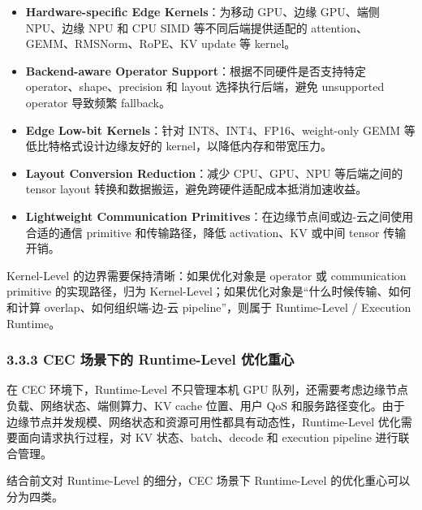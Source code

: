 \documentclass[a4paper,10pt]{ctexart}
\begin{document}
\begin{itemize}
\item \textbf{Hardware-specific Edge Kernels}：为移动 GPU、边缘 GPU、端侧 NPU、边缘 NPU 和 CPU SIMD 等不同后端提供适配的 attention、GEMM、RMSNorm、RoPE、KV update 等 kernel。

\item \textbf{Backend-aware Operator Support}：根据不同硬件是否支持特定 operator、shape、precision 和 layout 选择执行后端，避免 unsupported operator 导致频繁 fallback。

\item \textbf{Edge Low-bit Kernels}：针对 INT8、INT4、FP16、weight-only GEMM 等低比特格式设计边缘友好的 kernel，以降低内存和带宽压力。

\item \textbf{Layout Conversion Reduction}：减少 CPU、GPU、NPU 等后端之间的 tensor layout 转换和数据搬运，避免跨硬件适配成本抵消加速收益。

\item \textbf{Lightweight Communication Primitives}：在边缘节点间或边-云之间使用合适的通信 primitive 和传输路径，降低 activation、KV 或中间 tensor 传输开销。



\end{itemize}
Kernel-Level 的边界需要保持清晰：如果优化对象是 operator 或 communication primitive 的实现路径，归为 Kernel-Level；如果优化对象是“什么时候传输、如何和计算 overlap、如何组织端-边-云 pipeline”，则属于 Runtime-Level / Execution Runtime。








\subsubsection*{3.3.3 CEC 场景下的 Runtime-Level 优化重心}



在 CEC 环境下，Runtime-Level 不只管理本机 GPU 队列，还需要考虑边缘节点负载、网络状态、端侧算力、KV cache 位置、用户 QoS 和服务路径变化。由于边缘节点并发规模、网络状态和资源可用性都具有动态性，Runtime-Level 优化需要面向请求执行过程，对 KV 状态、batch、decode 和 execution pipeline 进行联合管理。




结合前文对 Runtime-Level 的细分，CEC 场景下 Runtime-Level 的优化重心可以分为四类。
\end{document}
